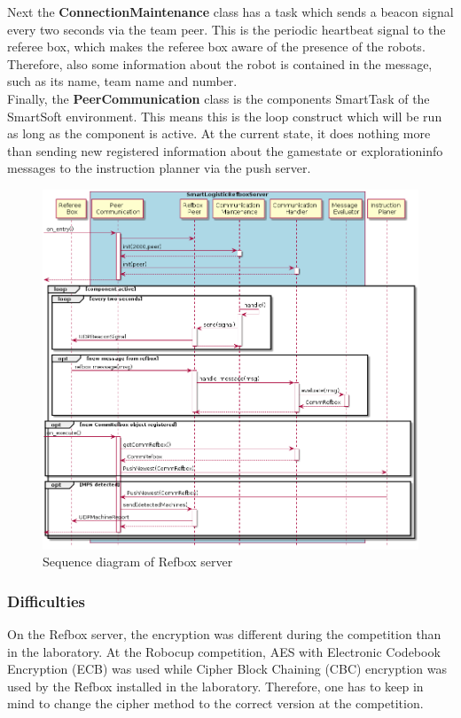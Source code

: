 Next the \textbf{ConnectionMaintenance} class has a task which sends a beacon signal every two seconds via the team peer. This is the periodic heartbeat signal to the referee box, which makes the referee box aware of the presence of the robots. Therefore, also some information about the robot is contained in the message, such as its name, team name and number.\\

Finally, the \textbf{PeerCommunication} class is the components SmartTask of the SmartSoft environment. This means this is the loop construct which will be run as long as the component is active. At the current state, it does nothing more than sending new registered information about the gamestate or explorationinfo messages to the instruction planner via the push server.\\

\begin{figure}[!h]
\centering
\includegraphics[width=\linewidth]{pic/sequence_diagram_RefboxServer.png}
\caption{Sequence diagram of Refbox server \cite{BOK}}
\label{fig:sequenceDiagramRefboxServer}
\end{figure}


\subsubsection{Difficulties}

On the Refbox server, the encryption was different during the competition than in the laboratory. At the Robocup competition, AES with Electronic Codebook Encryption (ECB) was used while Cipher Block Chaining (CBC) encryption was used by the Refbox installed in the laboratory. Therefore, one has to keep in mind to change the cipher method to the correct version at the competition. \\